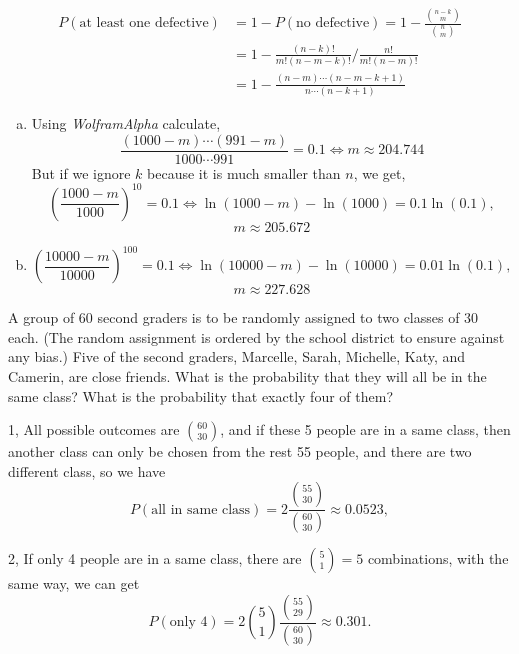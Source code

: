 \documentclass[14pt]{elegantbook}
\begin{document}
    \begin{solution}
        \begin{align*}
            P(\text{at least one defective})&=1-P(\text{no defective})=1-\frac{\binom{n-k}{m}}{\binom{n}{m}}\\
            &=1-\frac{(n-k)!}{m!(n-m-k)!}\big/\frac{n!}{m!(n-m)!}\\
            &=1-\frac{(n-m)\cdots(n-m-k+1)}{n\cdots(n-k+1)}
        \end{align*}
        \begin{enumerate}[(a)]
            \item Using \emph{WolframAlpha} calculate, 
            \[\frac{(1000-m)\cdots(991-m)}{1000\cdots991}=0.1\Leftrightarrow m\approx 204.744 \]
            But if we ignore $k$ because it is much smaller than $n$, we get,
            \[
                \left(\frac{1000-m}{1000}\right)^{10}=0.1\Leftrightarrow \ln(1000-m)-\ln(1000)=0.1\ln(0.1), 
            \]
            \[m\approx 205.672\]
            \item \[
                \left(\frac{10000-m}{10000}\right)^{100}=0.1\Leftrightarrow \ln(10000-m)-\ln(10000)=0.01\ln(0.1), 
            \]
            \[m\approx 227.628\]
        \end{enumerate}
    \end{solution}

    \begin{exercise*}[3]
        A group of $60$ second graders is to be randomly assigned to two classes of $30$ each. (The random assignment is ordered by the school district to ensure against any bias.) Five of the second graders, Marcelle, Sarah, Michelle, Katy, and Camerin, are close friends. What is the probability that they will all be in the same class? What is the probability that exactly four of them? 
    \end{exercise*}

    \begin{solution}

        1, All possible outcomes are $\binom{60}{30}$, and if these 5 people are in a same class, then another class can only be chosen from the rest 55 people, and there are two different class, so we have
        \[
            P(\text{all in same class})=2\frac{\binom{55}{30}}{\binom{60}{30}}\approx 0.0523, 
        \]

        2, If only 4 people are in a same class, there are $\binom{5}{1}=5$ combinations, with the same way, we can get 
        \[
            P(\text{only 4})=2\binom{5}{1}\frac{\binom{55}{29}}{\binom{60}{30}}\approx 0.301. 
        \]
    \end{solution}
\end{document}

